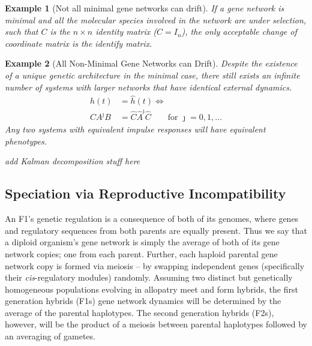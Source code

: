 \documentclass{article}
\newcommand{\plr}[1]{{\color{blue}\it #1}}
\newcommand{\1}{\mathbbm{1}}
\newtheorem{example}{Example}
\begin{document}
  
    \begin{example}[Not all minimal gene networks can drift]
      If a gene network is minimal and all the molecular species involved in the network are under selection, such that $C$ is the $n \times n$ identity matrix  ($C = I_{n}$), the only acceptable  change of coordinate matrix is the identify matrix.
     
      \end{example}
      \begin{example}[All Non-Minimal Gene Networks can Drift]
      
      Despite the existence of a unique genetic architecture in the minimal case, there still exists an infinite number of systems with larger networks that have identical external dynamics. 
      \begin{align}
        h(t) &= \widehat{h}(t) \iff \\ 
        CA^{\jmath}B &= \widehat{C} \widehat{A}^{\jmath} \widehat{C} \qquad \text{for } \jmath = 0, 1, \dots
      \end{align}
      Any two systems with equivalent impulse responses will have equivalent phenotypes.
      \end{example}

      \plr{add Kalman decomposition stuff here}

      \subsection*{Speciation via Reproductive Incompatibility}


     An F1's genetic regulation is a consequence of both of its genomes, where genes and regulatory sequences from both parents are equally present. Thus we say that a diploid organism's gene network is simply the average of both of its gene network copies; one from each parent. Further, each haploid parental gene network copy is formed via meiosis -- by swapping independent genes (specifically their \emph{cis}-regulatory modules) randomly. Assuming two distinct but genetically homogeneous populations evolving in allopatry meet and form hybrids, the first generation hybrids (F1s) gene network dynamics will be determined by the average of the parental haplotypes. The second generation hybrids (F2s), however, will be the product of a meiosis between parental haplotypes followed by an averaging of gametes. 
\end{document}
